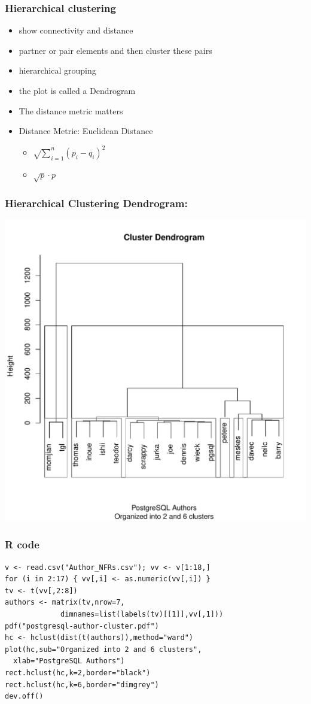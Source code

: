 \documentclass[bigger]{beamer}
\begin{document}
\begin{frame}
\frametitle{Hierarchical clustering}
\label{sec-1-4}


\begin{itemize}
\item show connectivity and distance
\item partner or pair elements and then cluster these pairs
\item hierarchical grouping
\item the plot is called a Dendrogram
\item The distance metric matters
\item Distance Metric: Euclidean Distance
\begin{itemize}
\item $\sqrt \sum_{i=1}^n (p_i - q_i)^2$
\item $\sqrt p \cdot p$
\end{itemize}
\end{itemize}
\end{frame}
\begin{frame}
\frametitle{Hierarchical Clustering Dendrogram:}
\label{sec-1-5}

   \includegraphics[height=0.8\textheight]{./postgresql-author-cluster.pdf}        
\end{frame}
\begin{frame}[fragile]
\frametitle{R code}
\label{sec-1-6}


\begin{verbatim}
v <- read.csv("Author_NFRs.csv"); vv <- v[1:18,]
for (i in 2:17) { vv[,i] <- as.numeric(vv[,i]) }
tv <- t(vv[,2:8])
authors <- matrix(tv,nrow=7,
             dimnames=list(labels(tv)[[1]],vv[,1]))
pdf("postgresql-author-cluster.pdf")
hc <- hclust(dist(t(authors)),method="ward")
plot(hc,sub="Organized into 2 and 6 clusters",
  xlab="PostgreSQL Authors")
rect.hclust(hc,k=2,border="black")
rect.hclust(hc,k=6,border="dimgrey")
dev.off()
\end{verbatim}
\end{frame}
\end{document}
